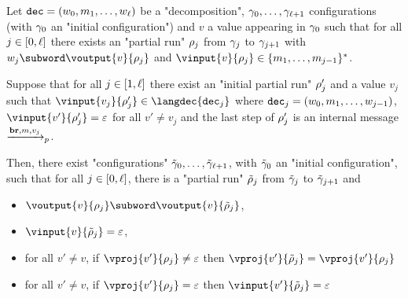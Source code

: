 \begin{lemma}
	\label{lem:follower-composition-completion}
	Let $\mathtt{dec} = (w_0, m_1, \ldots, w_\ell)$ be a "decomposition", $\gamma_0, \ldots, \gamma_{\ell+1}$ configurations (with $\gamma_0$ an "initial configuration") and $v$ a value appearing in $\gamma_0$ such that for all $j \in[0,\ell]$ there exists an "partial run" $\rho_j$ from $\gamma_{j}$ to $\gamma_{j+1}$ with $w_j \subword \voutput{v}{\run_j}$ and $\vinput{v}{\run_j} \in \set{m_1,\ldots, m_{j-1}}^*$. 
	
	Suppose that for all $j \in[1,\ell]$ there exist an "initial partial run" $\rho'_j$ and a value $v_j$ such that $\vinput{v_j}{\run'_j} \in \langdec{\decsymb_j}$ where $\mathtt{dec}_j = (w_0, m_1, \ldots, w_{j-1})$, $\vinput{v'}{\run'_j} = \varepsilon$ for all $v' \neq v_j$ and the last step of $\rho'_j$ is an internal message $\xrightarrow{\textbf{br}, m, v_j}_{p}$.
	
	Then, there exist "configurations" $\Tilde{\gamma}_0, \ldots, \Tilde{\gamma}_{\ell+1}$, with $\Tilde{\gamma}_0$ an "initial configuration", such that for all $j \in[0,\ell]$, there is a "partial run" $\Tilde{\rho}_j$ from $\Tilde{\gamma}_j$ to $\Tilde{\gamma}_{j+1}$ and
	\begin{itemize}
		\item $\voutput{v}{\run_j} \subword \voutput{v}{\Tilde{\run}_j}$, 
		
		\item $\vinput{v}{\Tilde{\run}_j} = \varepsilon$,
		
		\item for all $v' \neq v$, if $\vproj{v'}{\run_j} \neq \varepsilon$ then $\vproj{v'}{\Tilde{\run}_j} = \vproj{v'}{\run_j}$
		
		\item for all $v' \neq v$, if $\vproj{v'}{\run_j} = \varepsilon$ then $\vinput{v'}{\Tilde{\run}_j} = \varepsilon$
\end{itemize}
\end{lemma}


